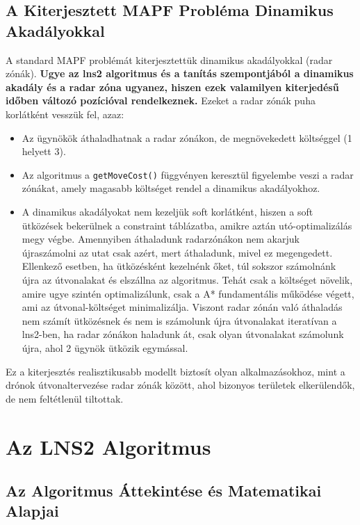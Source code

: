 \documentclass[a4paper,12pt]{article}
\begin{document}
\subsection{A Kiterjesztett MAPF Probléma Dinamikus Akadályokkal}

A standard MAPF problémát kiterjesztettük dinamikus akadályokkal (radar zónák). \textbf{Ugye az lns2 algoritmus és a tanítás szempontjából a dinamikus akadály és a radar zóna ugyanez, hiszen ezek valamilyen kiterjedésű időben változó pozícióval rendelkeznek.} Ezeket a radar zónák puha korlátként vesszük fel, azaz:

\begin{itemize}
    \item Az ügynökök áthaladhatnak a radar zónákon, de megnövekedett költséggel (1 helyett 3).
    \item Az algoritmus a \texttt{getMoveCost()} függvényen keresztül figyelembe veszi a radar zónákat, amely magasabb költséget rendel a dinamikus akadályokhoz.
    \item A dinamikus akadályokat nem kezeljük soft korlátként, hiszen a soft ütközések bekerülnek a constraint táblázatba, amikre aztán utó-optimalizálás megy végbe. Amennyiben áthaladunk radarzónákon nem akarjuk újraszámolni az utat csak azért, mert áthaladunk, mivel ez megengedett. Ellenkező esetben, ha ütközésként kezelnénk őket, túl sokszor számolnánk újra az útvonalakat és elszállna az algoritmus. Tehát csak a költséget növelik, amire ugye szintén optimalizálunk, csak a A* fundamentális működése végett, ami az útvonal-költséget minimalizálja. Viszont radar zónán való áthaladás nem számít ütközésnek és nem is számolunk újra útvonalakat iteratívan a lns2-ben, ha radar zónákon haladunk át, csak olyan útvonalakat számolunk újra, ahol 2 ügynök ütközik egymással.
\end{itemize}

Ez a kiterjesztés realisztikusabb modellt biztosít olyan alkalmazásokhoz, mint a drónok útvonaltervezése radar zónák között, ahol bizonyos területek elkerülendők, de nem feltétlenül tiltottak.

\section{Az LNS2 Algoritmus}

\subsection{Az Algoritmus Áttekintése és Matematikai Alapjai}
\end{document}
